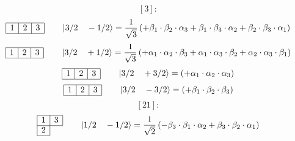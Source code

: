 \documentclass[fleqn]{article}%
\begin{document}
%
\vspace{0.25cm}%
\begin{dmath*}\left[3\right]:\end{dmath*}%
\vspace{0.25cm}%
\begin{dmath*}\begin{array}{|c|c|c|} \hline 1 & 2 & 3\\ \cline{1-3} \end{array} \qquad \ket{ 3/2 \quad  -1/2 } = \frac{1}{\sqrt{3}} \left( + \beta_{1} \cdot \beta_{2} \cdot \alpha_{3}  + \beta_{1} \cdot \beta_{3} \cdot \alpha_{2}  + \beta_{2} \cdot \beta_{3} \cdot \alpha_{1}\right) \end{dmath*}%
\vspace{0.25cm}%
\begin{dmath*}\begin{array}{|c|c|c|} \hline 1 & 2 & 3\\ \cline{1-3} \end{array} \qquad \ket{ 3/2 \quad  +1/2 } = \frac{1}{\sqrt{3}} \left( + \alpha_{1} \cdot \alpha_{2} \cdot \beta_{3}  + \alpha_{1} \cdot \alpha_{3} \cdot \beta_{2}  + \alpha_{2} \cdot \alpha_{3} \cdot \beta_{1}\right) \end{dmath*}%
\vspace{0.25cm}%
\begin{dmath*}\begin{array}{|c|c|c|} \hline 1 & 2 & 3\\ \cline{1-3} \end{array} \qquad \ket{ 3/2 \quad  +3/2 } = \left( + \alpha_{1} \cdot \alpha_{2} \cdot \alpha_{3}\right) \end{dmath*}%
\vspace{0.25cm}%
\begin{dmath*}\begin{array}{|c|c|c|} \hline 1 & 2 & 3\\ \cline{1-3} \end{array} \qquad \ket{ 3/2 \quad  -3/2 } = \left( + \beta_{1} \cdot \beta_{2} \cdot \beta_{3}\right) \end{dmath*}%
\vspace{0.25cm}%
\vspace{0.25cm}%
\vspace{0.25cm}%
\begin{dmath*}\left[21\right]:\end{dmath*}%
\vspace{0.25cm}%
\begin{dmath*}\begin{array}{|c|c|} \hline 1 & 3\\ \cline{1-2} 2\\ \cline{1-1} \end{array} \qquad \ket{ 1/2 \quad  -1/2 } = \frac{1}{\sqrt{2}} \left( - \beta_{3} \cdot \beta_{1} \cdot \alpha_{2}  + \beta_{3} \cdot \beta_{2} \cdot \alpha_{1}\right) \end{dmath*}%
\end{document}
